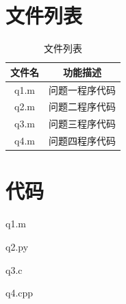 \documentclass[12pt,hyperref,a4paper,UTF8]{ctexart}
\begin{document}

\newpage


\newpage
\begin{appendices}

\section{文件列表}

\begin{table}[h]  
	\centering  
	\caption{文件列表}  
	\renewcommand{\arraystretch}{1.25} %
	\begin{tabular}{c@{\hspace{20pt}}c} %
		\toprule  
		文件名   & 功能描述 \\
		\midrule  
		q1.m & 问题一程序代码 \\
		q2.m & 问题二程序代码 \\
		q3.m & 问题三程序代码 \\
		q4.m & 问题四程序代码 \\
		\toprule  
	\end{tabular}  
	\label{tab:文件列表}  
\end{table}  
	
	\section{代码}
	\noindent q1.m
	
	q2.py
	
	q3.c
	
	q4.cpp
	
\end{appendices}
\end{document}
